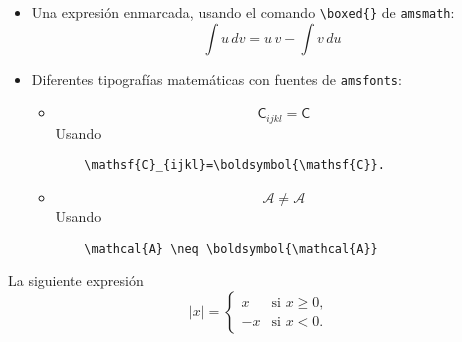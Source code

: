 \documentclass[11pt]{exam}
\begin{document}
\begin{questions}
\begin{itemize}
\begin{verbatim}

	\begin{align} 
	 ... &= ...\\
	 ... &= ...\\
	 ... &= ...
	\end{align} 
\end{verbatim}

\item Una expresión enmarcada, usando el comando \verb|\boxed{}| de \texttt{amsmath}:
\newline
\begin{equation*}
\boxed{\int u \, dv=u\,v-\int v \, du}
\end{equation*}

\item Diferentes tipografías matemáticas con fuentes de \texttt{amsfonts}:
\begin{itemize}
\item 
\begin{equation}
\mathsf{C}_{ijkl}=\boldsymbol{\mathsf{C}}
\end{equation}
Usando

\begin{verbatim}
	\mathsf{C}_{ijkl}=\boldsymbol{\mathsf{C}}.
\end{verbatim}

\item 
\begin{equation}
\mathcal{A} \neq \boldsymbol{\mathcal{A}}
\end{equation}
Usando

\begin{verbatim}
	\mathcal{A} \neq \boldsymbol{\mathcal{A}}
\end{verbatim}


\end{itemize}
\end{itemize}
\item La siguiente expresión
\begin{equation}
 |x| = \left\{ \begin{array}{ll}
         x & \mbox{si $x \geq 0$},\\
        -x & \mbox{si $x < 0$}.\end{array} \right.
\end{equation}


\end{questions}
\end{document}
